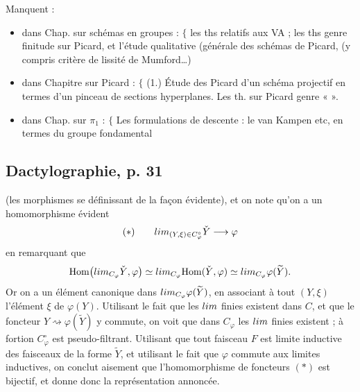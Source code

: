 \documentclass[11pt,a4paper]{article}
\begin{document}
Manquent :


\begin{itemize}
  \item dans Chap. sur schémas en groupes : $\{$ les ths relatifs aux VA ; les ths
  genre finitude sur Picard, et l'étude qualitative (générale des schémas de
  Picard, (y compris critère de lissité de Mumford\ldots)
  \item dans Chapitre sur Picard : $\{$ (1.)  Étude des
  Picard d'un schéma projectif en termes d'un pinceau de sections hyperplanes.
  Les th. sur Picard genre «  ».
  \item dans Chap. sur $\pi_1$ : $\{$ Les formulations de descente : le van
  Kampen etc, en termes du groupe fondamental
\end{itemize}



\subsection*{Dactylographie, p. 31}


(les morphismes se définissant de la façon évidente), et on note qu'on a un
homomorphisme évident
\[
  (\ast) \qquad \varinjlim_{(Y, \xi) \in C_\varphi^{\circ}} \check{Y}
  \longrightarrow \varphi
\]
en remarquant que
\[
  \mathrm{Hom}\bigl(\varinjlim_{C_\varphi} \check{Y}, \varphi\bigr) \simeq
  \varprojlim_{C_\varphi} \mathrm{Hom}(\check{Y}, \varphi) \simeq
  \varprojlim_{C_\varphi} \varphi(\widetilde{Y}) .
\]
Or on a un élément canonique dans $\varprojlim_{C_\varphi} \varphi(\widetilde{Y})$,
en associant à tout $(Y, \xi)$ l'élément $\xi$ de $\varphi(Y)$. Utilisant le
fait que les $\varprojlim$ finies existent dans $C$, et que le foncteur $Y
\rightsquigarrow \varphi(\widetilde{Y})$ y commute, on voit que dans $C_\varphi$
les $\varprojlim$ finies existent ; à fortion $C_\varphi^{\circ}$ est
pseudo-filtrant. Utilisant que tout faisceau $F$ est limite inductive des
faisceaux de la forme $\widetilde{Y}$, et utilisant le fait que $\varphi$
commute aux limites inductives, on conclut aisement que l'homomorphisme de
foncteurs $(\ast)$ est bijectif, et donne donc la représentation annoncée.
\end{document}
